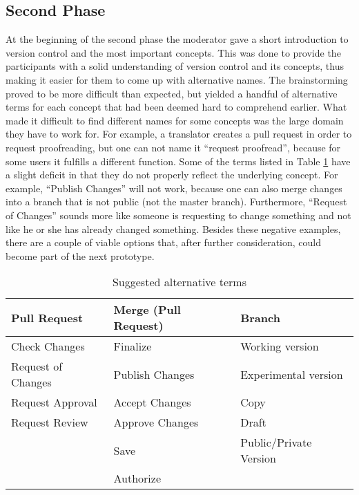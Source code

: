 \subsection{Second Phase}
At the beginning of the second phase the moderator gave a short introduction to version control and the most important concepts. This was done to provide the participants with a solid understanding of version control and its concepts, thus making it easier for them to come up with alternative names. The brainstorming proved to be more difficult than expected, but yielded a handful of alternative terms for each concept that had been deemed hard to comprehend earlier. What made it difficult to find different names for some concepts was the large domain they have to work for. For example, a translator creates a pull request in order to request proofreading, but one can not name it “request proofread”, because for some users it fulfills a different function. Some of the terms listed in Table \ref{table:alt-terminology} have a slight deficit in that they do not properly reflect the underlying concept. For example, “Publish Changes” will not work, because one can also merge changes into a branch that is not public (not the master branch). Furthermore, “Request of Changes” sounds more like someone is requesting to change something and not like he or she has already changed something. Besides these negative examples, there are a couple of viable options that, after further consideration, could become part of the next prototype.

\begin{table}[h!]
\begin{tabular}{|l|l|l|}
\hline
\rowcolor[HTML]{EFEFEF} 
{\bf Pull Request} & {\bf Merge (Pull Request)} & {\bf Branch}           \\ \hline
Check Changes      & Finalize                   & Working version        \\ 
Request of Changes & Publish Changes            & Experimental version   \\ 
Request Approval   & Accept Changes             & Copy                   \\ 
Request Review     & Approve Changes            & Draft                  \\ 
                   & Save                       & Public/Private Version \\ 
                   & Authorize                  &                        \\ \hline
\end{tabular}
\centering
\caption{Suggested alternative terms}
\label{table:alt-terminology}
\end{table}

